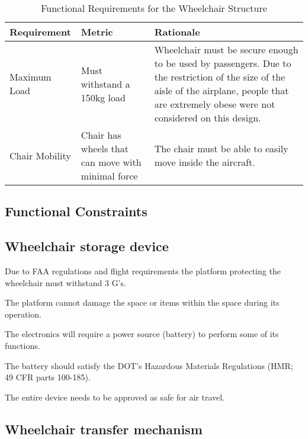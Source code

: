 \begin{table}
\begin{tabular} {| p{4cm} | p{5cm} | p{5cm} |}
\hline
\textbf{Requirement} & \textbf{Metric} & \textbf{Rationale} \\ \hline

Maximum Load & Must withstand a 150kg load & Wheelchair must be secure enough to be used by passengers. Due to the restriction of the size of the aisle of the airplane, people that are extremely obese were not considered on this design. \\ \hline
Chair Mobility & Chair has wheels that can move with minimal force & The chair must be able to easily move inside the aircraft. \\ \hline
\end{tabular} 
\caption{Functional Requirements for the Wheelchair Structure}
\label{tab:functional_requirements_wheelchair}
\end{table}

\clearpage
\newpage

\subsection{Functional Constraints}

\subsection*{Wheelchair storage device}

\begin{list}{-}{}
  \item Due to FAA regulations and flight requirements the platform protecting the wheelchair must withstand 3 G's.
  \item The platform cannot damage the space or items within the space during its operation.
  \item The electronics will require a power source (battery) to perform some of its functions.
  \item The battery should satisfy the DOT’s Hazardous Materials Regulations (HMR; 49 CFR parts 100-185).
  \item The entire device needs to be approved as safe for air travel.
\end{list}

\subsection*{Wheelchair transfer mechanism}

